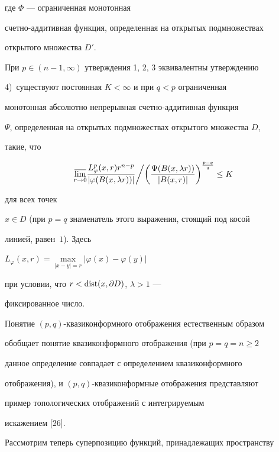 где $\Phi$ --- ограниченная монотонная


счетно-аддитивная функция, определенная на открытых подмножествах


открытого множества $D'$.





При $p\in(n-1,\infty)$ утверждения 1, 2, 3 эквивалентны утверждению





4)~существуют постоянная $K<\infty$ и при $q<p$ ограниченная


монотонная абсолютно непрерывная счетно-аддитивная функция


$\Psi$, определенная на открытых подмножествах открытого множества $D$,


такие, что


$$


\underset{r\to 0}{\varlimsup}{}


\frac{L_{\varphi}^{p}(x,r)r^{{n}-p}} {|\varphi(B(x,\lambda


r))|}\bigg/ \biggl(\frac{\Psi(B(x,\lambda


r))}{|B(x,r)|}\biggr)^{\frac{p-q}{q}}\leq K


$$


для всех точек


$x\in D$ (при $p=q$ знаменатель этого выражения, стоящий под косой


линией, равен~$1$). Здесь


$L_{\varphi}(x,r)=\max\limits_{|x-y|=r}|\varphi(x)-\varphi(y)|$


при условии, что $r<\operatorname{dist}(x,\partial D)$, $\lambda>1$ ---


фиксированное число.





Понятие $(p,q)$-квазиконформного отображения естественным образом


обобщает понятие квазиконформного отображения (при $p=q=n\geq2$


данное определение совпадает с определением квазиконформного


отображения), и $(p,q)$-квазиконформные отображения представляют


пример топологических отображений с интегрируемым


искажением [26].





Рассмотрим теперь суперпозицию функций, принадлежащих пространству


